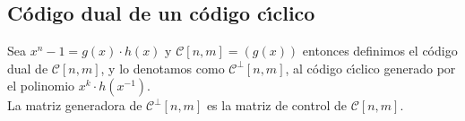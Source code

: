 \subsection{C\'odigo dual de un c\'odigo c\'{\i}clico}

Sea $x^n-1=g(x)\cdot h(x)$ y $\mathcal{C}[n,m]=(g(x))$ entonces definimos el
c\'odigo dual de $\mathcal{C}[n,m]$, y lo denotamos como
$\mathcal{C}^{\perp}[n,m]$, al c\'odigo c\'{\i}clico generado por el
polinomio $x^k\cdot h(x^{-1})$.\\

La matriz generadora de $\mathcal{C}^{\perp}[n,m]$ es la matriz de control de
$\mathcal{C}[n,m]$.
